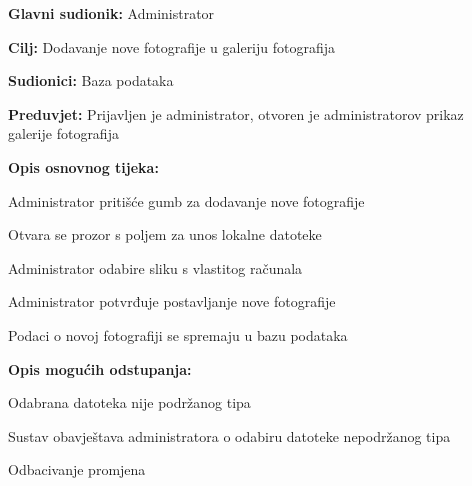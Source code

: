 					\noindent {}
					\begin{packed_item}
						
						\item \textbf{Glavni sudionik: }Administrator
						\item  \textbf{Cilj:} Dodavanje nove fotografije u galeriju fotografija
						\item  \textbf{Sudionici:} Baza podataka
						\item  \textbf{Preduvjet:} Prijavljen je administrator, otvoren je administratorov prikaz galerije fotografija
						\item  \textbf{Opis osnovnog tijeka:}
						
						\item[] \begin{packed_enum}
							
							\item Administrator pritišće gumb za dodavanje nove fotografije
							\item Otvara se prozor s poljem za unos lokalne datoteke
							\item Administrator odabire sliku s vlastitog računala
							\item Administrator potvrđuje postavljanje nove fotografije
							\item Podaci o novoj fotografiji se spremaju u bazu podataka

						\end{packed_enum}
						
						\item  \textbf{Opis mogućih odstupanja:}
						
						\item[] \begin{packed_item}
							
							\item[3.a] Odabrana datoteka nije podržanog tipa
							\item[] \begin{packed_enum}
								
								\item Sustav obavještava administratora o odabiru datoteke nepodržanog tipa
								\item Odbacivanje promjena
								
							\end{packed_enum}
						\end{packed_item}
					\end{packed_item}
					
